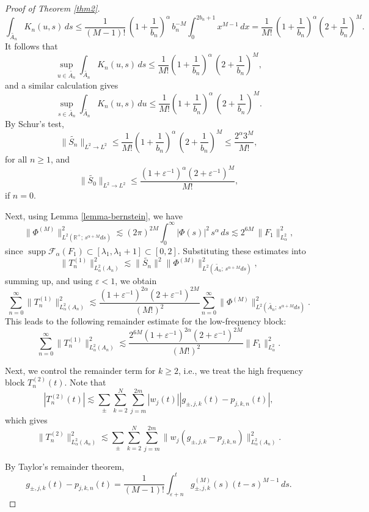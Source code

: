 \documentclass[11pt,a4paper,reqno,dvipsnames]{amsart}
\newcommand{\F}{\mathcal{F}}
\newcommand{\ep}{\varepsilon}
\newcommand{\R}{\mathbb R}
\renewcommand{\ge}{\geqslant}
\renewcommand{\le}{\leqslant}
\numberwithin{equation}{section}
\theoremstyle{plain}
\theoremstyle{definition}
\theoremstyle{remark}
\begin{document}
\begin{proof}[Proof of Theorem \ref{thm2}]
$$\int_{\widetilde{A_n}} K_n(u,s)\, ds \le \frac{1}{(M-1)!}\, \left(1 + \frac{1}{b_n}\right)^\alpha\, b_n^{-M} \int_0^{2b_n+1} x^{M-1}\, dx = \frac{1}{M!}\, \left(1 + \frac{1}{b_n}\right)^\alpha \left(2 + \frac{1}{b_n} \right)^M.$$
It follows that
    $$\sup_{u\in \widetilde{A_n}}\int_{\widetilde{A_n}} K_n(u,s)\, ds \le \frac{1}{M!} \left(1 + \frac{1}{b_n}\right)^\alpha\, \left(2 + \frac{1}{b_n}\right)^M,$$
and a similar calculation gives
     $$\sup_{s\in \widetilde{A_n}}\int_{\widetilde{A_n}} K_n(u,s)\, du \le \frac{1}{M!} \left(1 + \frac{1}{b_n}\right)^\alpha\, \left(2 + \frac{1}{b_n}\right)^M.$$
By Schur's test,
$$\|\widetilde{S_n}\|_{L^2\to L^2} \le \frac{1}{M!} \left(1 + \frac{1}{b_n}\right)^\alpha\, \left(2 + \frac{1}{b_n}\right)^M \le \frac{2^\alpha 3^M}{M!},$$
for all $n\ge 1$, and
$$\|\widetilde{S_0}\|_{L^2\to L^2} \le \frac{(1 + \ep^{-1})^\alpha (2 + \ep^{-1})^M}{M!},$$
if $n = 0$.

Next, using Lemma \ref{lemma-bernstein}, we have
\begin{equation}
    \label{lemma-bernstein-2}
    \|\Phi^{(M)}\|_{L^2(\R^+; \, s^{\alpha + M} ds)}^2 \lesssim (2\pi)^{2M} \int_0^\infty |\Phi(s)|^2\, s^\alpha\, ds \lesssim 2^{6M}\,\|F_1\|^2_{L^2_\alpha},
\end{equation}
since $\operatorname{supp} \F_\alpha(F_1) \subset [\lambda_1, \lambda_1 + 1] \subset [0,2]$. Substituting these estimates into
$$\|T_n^{(1)}\|^2_{L^2_\alpha(A_n)}  \lesssim \|\widetilde{S_n}\|^2 \|\Phi^{(M)}\|_{L^2(\widetilde{A_n}; \, s^{\alpha + M} ds)}^2,$$
summing up, and using $\ep < 1$, we obtain
$$\sum_{n=0}^\infty \|T_n^{(1)}\|^2_{L^2_\alpha(A_n)} \lesssim \frac{(1 + \ep^{-1})^{2\alpha} (2 + \ep^{-1})^{2M}}{(M!)^2} \sum_{n=0}^\infty \|\Phi^{(M)}\|_{L^2(\widetilde{A_n}; \, s^{\alpha + M} ds)}^2.$$
This leads to the following remainder estimate for the low-frequency block:
$$\sum_{n=0}^\infty \|T_n^{(1)}\|^2_{L^2_\alpha(A_n)} \lesssim \frac{2^{6M}(1 + \ep^{-1})^{2\alpha} (2 + \ep^{-1})^{2M}}{(M!)^2}\|F_1\|^2_{L^2_\alpha}.$$

Next, we control the remainder term for $k \ge 2$, i.e., we treat the high frequency block $T_n^{(2)}(t)$. Note that
$$|T_n^{(2)}(t)| \lesssim \sum_{\pm} \sum_{k=2}^N \sum_{j=m}^{2m} |w_j(t)| \left|g_{\pm, j,k}(t)  - p_{j,k,n}(t) \right|,$$
which gives
$$\|T_n^{(2)}\|^2_{L^2_\alpha(A_n)} \lesssim \sum_{\pm} \sum_{k=2}^N \sum_{j=m}^{2m} \|w_j \left(g_{\pm, j,k} - p_{j,k,n} \right)\|^2_{L^2_\alpha(A_n)}.$$

By Taylor's remainder theorem, 
$$g_{\pm, j,k}(t)  - p_{j,k,n}(t) = \frac{1}{(M-1)!} \int_{\ep + n}^{t} g^{(M)}_{\pm,j,k}(s) (t-s)^{M-1}\, ds.$$


\end{proof}
\end{document}

